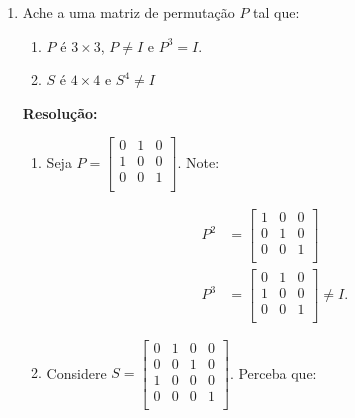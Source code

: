 \documentclass[leqno]{article}
\begin{document}
\begin{enumerate}
    \item Ache a uma matriz de permutação $P$ tal que:
    
    \begin{enumerate}
        \item $P$ é $3\times3$, $P\neq I$ e $P^3=I$.
        \item $S$ é $4\times4$ e $S^4\neq I$
    \end{enumerate}
    
    \textbf{Resolução:}
    
    \begin{enumerate}
        \item Seja $P=\begin{bmatrix}
        0 & 1 & 0\\
        1 & 0 & 0\\
        0 & 0 & 1\\
        \end{bmatrix}$. Note:
        
        \begin{align*}
            P^2&=\begin{bmatrix}
            1 & 0 & 0\\
            0 & 1 & 0\\
            0 & 0 & 1\\
            \end{bmatrix}\\
            P^3&=\begin{bmatrix}
            0 & 1 & 0\\
            1 & 0 & 0\\
            0 & 0 & 1\\
            \end{bmatrix}\neq I\text{.}
        \end{align*}
        
        \item Considere $S=\begin{bmatrix}
        0 & 1 & 0 & 0\\
        0 & 0 & 1 & 0\\
        1 & 0 & 0 & 0\\
        0 & 0 & 0 & 1\\
        \end{bmatrix}$. Perceba que:
        

\end{enumerate}
\end{enumerate}
\end{document}
